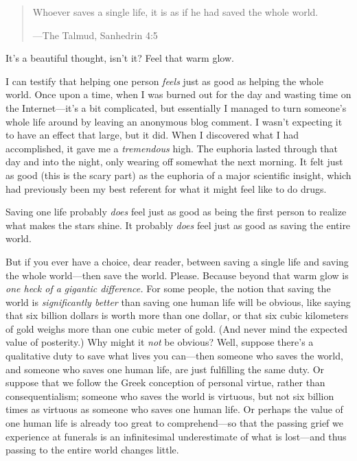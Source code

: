 \bigskip


\begin{quote}

 Whoever saves a single life, it is as if he had saved the whole
world.

{\raggedleft
 {}---The Talmud, Sanhedrin 4:5
 \par}
\end{quote}



 It's a beautiful thought, isn't
it? Feel that warm glow.


 I can testify that helping one person \textit{feels} just as good
as helping the whole world. Once upon a time, when I was burned out for
the day and wasting time on the Internet---it's a bit
complicated, but essentially I managed to turn
someone's whole life around by leaving an anonymous
blog comment. I wasn't expecting it to have an effect
that large, but it did. When I discovered what I had accomplished, it
gave me a \textit{tremendous} high. The euphoria lasted through that
day and into the night, only wearing off somewhat the next morning. It
felt just as good (this is the scary part) as the euphoria of a major
scientific insight, which had previously been my best referent for what
it might feel like to do drugs.


 Saving one life probably \textit{does} feel just as good as being
the first person to realize what makes the stars shine. It probably
\textit{does} feel just as good as saving the entire world.


 But if you ever have a choice, dear reader, between saving a
single life and saving the whole world---then save the world. Please.
Because beyond that warm glow is \textit{one heck of a}
\textit{gigantic difference.} For some people, the notion that saving
the world is \textit{significantly better} than saving one human life
will be obvious, like saying that six billion dollars is worth more
than one dollar, or that six cubic kilometers of gold weighs more than
one cubic meter of gold. (And never mind the expected value of
posterity.) Why might it \textit{not} be obvious? Well, suppose
there's a qualitative duty to save what lives you
can---then someone who saves the world, and someone who saves one human
life, are just fulfilling the same duty. Or suppose that we follow the
Greek conception of personal virtue, rather than consequentialism;
someone who saves the world is virtuous, but not six billion times as
virtuous as someone who saves one human life. Or perhaps the value of
one human life is already too great to comprehend---so that the passing
grief we experience at funerals is an infinitesimal underestimate of
what is lost---and thus passing to the entire world changes little.


